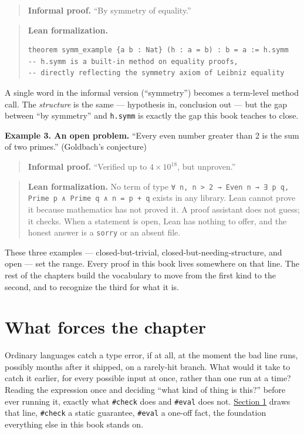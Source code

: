 \begin{quote}
\textbf{Informal proof.} ``By symmetry of equality.''
\end{quote}

\begin{quote}
\textbf{Lean formalization.}

\begin{lstlisting}
theorem symm_example {a b : Nat} (h : a = b) : b = a := h.symm
-- h.symm is a built-in method on equality proofs,
-- directly reflecting the symmetry axiom of Leibniz equality
\end{lstlisting}
\end{quote}

A single word in the informal version (``symmetry'') becomes a term-level method call. The \emph{structure} is the same --- hypothesis in, conclusion out --- but the gap between ``by symmetry'' and \texttt{h.symm} is exactly the gap this book teaches to close.

\textbf{Example 3. An open problem.} ``Every even number greater than 2 is the sum of two primes.'' (Goldbach's conjecture)

\begin{quote}
\textbf{Informal proof.} ``Verified up to \(4 \times 10^{18}\), but unproven.''
\end{quote}

\begin{quote}
\textbf{Lean formalization.} No term of type \texttt{∀ n, n > 2 → Even n → ∃ p q, Prime p ∧ Prime q ∧ n = p + q} exists in any library. Lean cannot prove it because mathematics has not proved it. A proof assistant does not guess; it checks. When a statement is open, Lean has nothing to offer, and the honest answer is a \texttt{sorry} or an absent file.
\end{quote}

These three examples --- closed-but-trivial, closed-but-needing-structure, and open --- set the range. Every proof in this book lives somewhere on that line. The rest of the chapters build the vocabulary to move from the first kind to the second, and to recognize the third for what it is.

\section*{What forces the chapter}\label{sec:01-basics:00-index:3}

Ordinary languages catch a type error, if at all, at the moment the bad line runs, possibly months after it shipped, on a rarely-hit branch. What would it take to catch it earlier, for every possible input at once, rather than one run at a time? Reading the expression once and deciding ``what kind of thing is this?'' before ever running it, exactly what \texttt{\#check} does and \texttt{\#eval} does not. \hyperref[sec:01-basics:01-everything-has-a-type:1]{Section 1} draws that line, \texttt{\#check} a static guarantee, \texttt{\#eval} a one-off fact, the foundation everything else in this book stands on.

